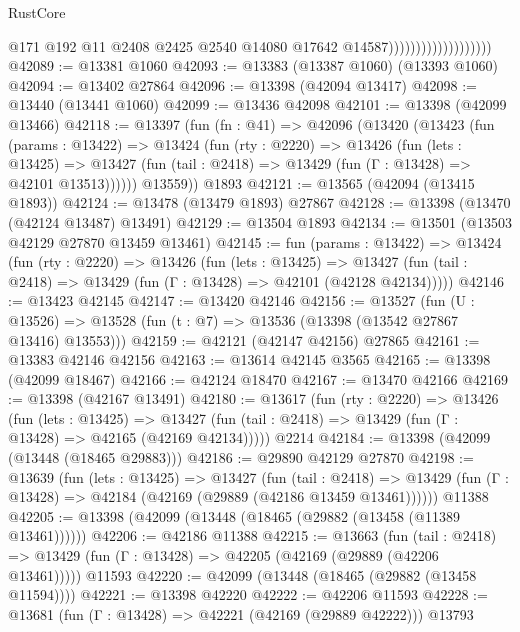 \begin{lexlean}{RustCore}
\begin{coremodule}
                                          @171
                                          @192
                                          @11
                                          @2408
                                          @2425
                                          @2540
                                          @14080
                                          @17642
                                          @14587)))))))))))))))))))
@42089 := @13381 @1060
@42093 := @13383 (@13387 @1060) (@13393 @1060)
@42094 := @13402 @27864
@42096 := @13398 (@42094 @13417)
@42098 := @13440 (@13441 @1060)
@42099 := @13436 @42098
@42101 := @13398 (@42099 @13466)
@42118 := @13397
    (fun (fn : @41) =>
    @42096
      (@13420
        (@13423
          (fun (params : @13422) =>
          @13424
            (fun (rty : @2220) =>
            @13426
              (fun (lets : @13425) =>
              @13427 (fun (tail : @2418) => @13429 (fun (Γ : @13428) => @42101 @13513))))))
        @13559))
    @1893
@42121 := @13565 (@42094 (@13415 @1893))
@42124 := @13478 (@13479 @1893) @27867
@42128 := @13398 (@13470 (@42124 @13487) @13491)
@42129 := @13504 @1893
@42134 := @13501 (@13503 @42129 @27870 @13459 @13461)
@42145 := fun (params : @13422) =>
  @13424
    (fun (rty : @2220) =>
    @13426
      (fun (lets : @13425) =>
      @13427 (fun (tail : @2418) => @13429 (fun (Γ : @13428) => @42101 (@42128 @42134)))))
@42146 := @13423 @42145
@42147 := @13420 @42146
@42156 := @13527
    (fun (U : @13526) => @13528 (fun (t : @7) => @13536 (@13398 (@13542 @27867 @13416) @13553)))
@42159 := @42121 (@42147 @42156) @27865
@42161 := @13383 @42146 @42156
@42163 := @13614 @42145 @3565
@42165 := @13398 (@42099 @18467)
@42166 := @42124 @18470
@42167 := @13470 @42166
@42169 := @13398 (@42167 @13491)
@42180 := @13617
    (fun (rty : @2220) =>
    @13426
      (fun (lets : @13425) =>
      @13427 (fun (tail : @2418) => @13429 (fun (Γ : @13428) => @42165 (@42169 @42134)))))
    @2214
@42184 := @13398 (@42099 (@13448 (@18465 @29883)))
@42186 := @29890 @42129 @27870
@42198 := @13639
    (fun (lets : @13425) =>
    @13427
      (fun (tail : @2418) =>
      @13429 (fun (Γ : @13428) => @42184 (@42169 (@29889 (@42186 @13459 @13461))))))
    @11388
@42205 := @13398 (@42099 (@13448 (@18465 (@29882 (@13458 (@11389 @13461))))))
@42206 := @42186 @11388
@42215 := @13663
    (fun (tail : @2418) => @13429 (fun (Γ : @13428) => @42205 (@42169 (@29889 (@42206 @13461)))))
    @11593
@42220 := @42099 (@13448 (@18465 (@29882 (@13458 @11594))))
@42221 := @13398 @42220
@42222 := @42206 @11593
@42228 := @13681 (fun (Γ : @13428) => @42221 (@42169 (@29889 @42222))) @13793

\end{coremodule}
\end{lexlean}

